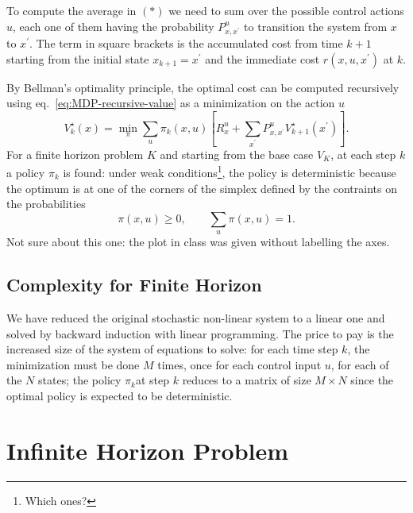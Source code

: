 To compute the average in $(*)$ we need to sum over the possible control actions $u$, each one of them having the probability $P_{x,x^\prime}^u$ to transition the system from $x$ to $x^\prime$. The term in square brackets is the accumulated cost from time $k+1$ starting from the initial state $x_{k+1}=x^\prime$ and the immediate cost $r(x,u,x^\prime)$ at $k$.

By Bellman's optimality principle, the optimal cost can be computed recursively using eq.~\eqref{eq:MDP-recursive-value} as a minimization on the action $u$
\begin{equation*}
  V_k^\star(x) = \min_\pi \sum_u \pi_k(x,u)\left[R^u_x + \sum_{x^\prime}P_{x,x^\prime}^u V^\star_{k+1}(x^\prime)\right].
\end{equation*}
For a finite horizon problem $K$ and starting from the base case $V_K$, at each step $k$ a policy $\pi_k$ is found: under weak conditions\footnote{Which ones?}, the policy is deterministic because the optimum is at one of the corners of the simplex defined by the contraints on the probabilities
\begin{equation*}
  \pi(x,u) \ge 0,\qquad \sum_u \pi(x,u) = 1.
\end{equation*}
Not sure about this one: the plot in class was given without labelling the axes.

\subsection{Complexity for Finite Horizon}
\label{sec:MDP-complexity-finite-horizon}

We have reduced the original stochastic non-linear system to a linear one and solved by backward induction with linear programming. The price to pay is the increased size of the system of equations to solve: for each time step $k$, the minimization must be done $M$ times, once for each control input $u$, for each of the $N$ states; the policy $\pi_k$at step $k$ reduces to a matrix of size $M\times N$ since the optimal policy is expected to be deterministic.


\section{Infinite Horizon Problem}
\label{sec:MDP-infinite-horizon}

